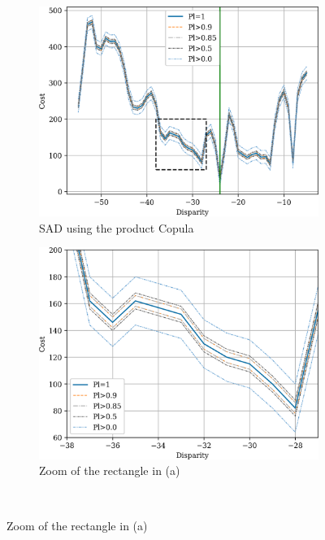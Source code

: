 \begin{figure}
    \centering
    \begin{subfigure}{0.48\linewidth}
        \centering
        \includegraphics[width=\linewidth]{Images/bel_independence_100_120.png}
        \caption{SAD using the product Copula}
        \label{fig:belief_independence}
    \end{subfigure}\hfill
    \begin{subfigure}{0.48\linewidth}
        \centering
        \includegraphics[width=\linewidth]{Images/bel_independence_100_120_zoom.png}
        \caption{Zoom of the rectangle in (a)}
        \label{fig:belief_independence_zoom}
    \end{subfigure}\\

\end{figure}
